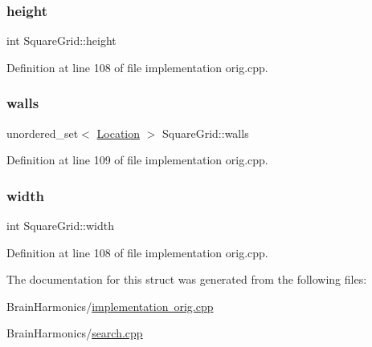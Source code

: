 \subsubsection{\texorpdfstring{height}{height}}
{\footnotesize\ttfamily int Square\+Grid\+::height}



Definition at line 108 of file implementation orig.\+cpp.

\mbox{\label{struct_square_grid_a1bc7e32bd195e42fd9685310d7ee65c5}} 
\subsubsection{\texorpdfstring{walls}{walls}}
{\footnotesize\ttfamily unordered\+\_\+set$<$ \mbox{\hyperlink{struct_square_grid_a2c9a2cbd3912aa48ac97289abc3f1c0f}{Location}} $>$ Square\+Grid\+::walls}



Definition at line 109 of file implementation orig.\+cpp.

\mbox{\label{struct_square_grid_af5476cf49f0bb03d1e940adbc6e5febf}} 
\subsubsection{\texorpdfstring{width}{width}}
{\footnotesize\ttfamily int Square\+Grid\+::width}



Definition at line 108 of file implementation orig.\+cpp.



The documentation for this struct was generated from the following files\+:\begin{DoxyCompactItemize}
\item 
Brain\+Harmonics/\mbox{\hyperlink{implementation_01orig_8cpp}{implementation orig.\+cpp}}\item 
Brain\+Harmonics/\mbox{\hyperlink{search_8cpp}{search.\+cpp}}\end{DoxyCompactItemize}
